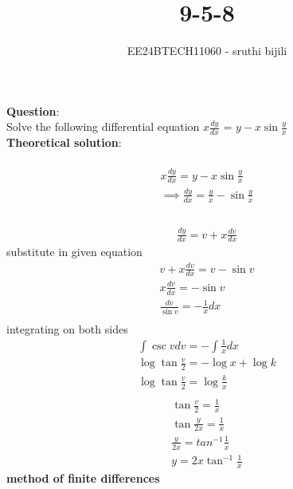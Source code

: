 \documentclass[journal]{IEEEtran}
\begin{document}

\vspace{3cm}

\title{9-5-8}
\author{EE24BTECH11060 - sruthi bijili}
\maketitle
\bigskip

\renewcommand{\thefigure}{\theenumi}
\renewcommand{\thetable}{\theenumi}
\textbf{Question}:\\
Solve the following differential equation $x\frac{dy}{dx}$ = $y-x\sin{\frac{y}{x}}$\\

\textbf{Theoretical solution}:\\
\\
\begin{align}
    x\frac{dy}{dx}=y-x\sin{\frac{y}{x}}\\
    \implies \frac{dy}{dx}=\frac{y}{x}-\sin{\frac{y}{x}}\\
\end{align}
\\
\begin{align}
    \frac{dy}{dx}=v+x\frac{dv}{dx}
\end{align}
substitute in given equation
\begin{align}
    v+x\frac{dv}{dx}=v-\sin{v}\\
    x\frac{dv}{dx}=-\sin{v}\\
    \frac{dv}{\sin{v}}=-\frac{1}{x}dx\\
\end{align}
integrating on both sides
\begin{align}
    \int{\csc{v}}dv=-\int{\frac{1}{x}}dx\\
    \log{\tan{\frac{v}{2}}}=-\log{x}+\log{k}\\
    \log{\tan{\frac{v}{2}}}=\log{\frac{k}{x}}\\
\end{align}
\begin{align}
    \tan{\frac{v}{2}}=\frac{1}{x}\\
    \tan{\frac{y}{2x}}=\frac{1}{x}\\
    \frac{y}{2x}=tan^{-1}{\frac{1}{x}}\\
    y=2x\tan^{-1}{\frac{1}{x}}
\end{align}
\textbf{method of finite differences}\\
\end{document}

